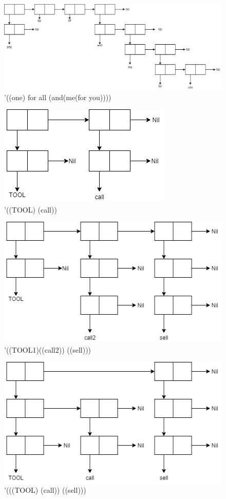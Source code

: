 \documentclass[a4paper, 12pt]{article}
\begin{document}
\begin{figure}[h!]
	\centering \includegraphics[scale=0.58]{3}
	\centering\caption{'((one) for all (and(me(for you))))}
\end{figure}
\clearpage
\newpage
\begin{figure}[h!]
	\centering \includegraphics[scale=0.8]{4}
	\centering\caption{'((TOOL) (call))}
\end{figure}
\begin{figure}[h!]
	\centering \includegraphics[scale=0.8]{5}
	\centering\caption{'((TOOL1)((call2)) ((sell)))}
\end{figure}
\clearpage
\newpage
\begin{figure}[h!]
	\centering \includegraphics[scale=0.8]{6}
	\centering\caption{'(((TOOL) (call)) ((sell)))}
\end{figure} 

\clearpage
\newpage

\printbibliography
{}
\end{document}
